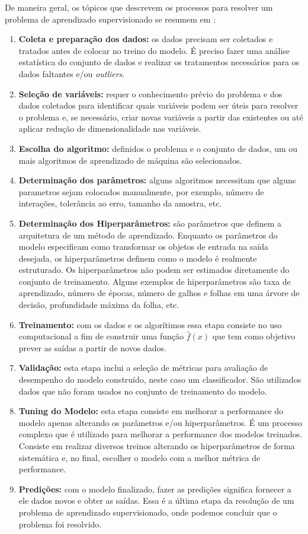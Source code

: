 De maneira geral, os tópicos que descrevem os processos para resolver um problema de aprendizado supervisionado se resumem em \cite{hastie} \cite{marsland}:

\begin{enumerate}
\item \textbf{Coleta e preparação dos dados:} os dados precisam ser coletados e tratados antes de colocar no treino do modelo. É preciso fazer uma análise estatística do conjunto de dados e realizar os tratamentos necessários para os dados faltantes e/ou \textit{outliers}.
\item \textbf{Seleção de variáveis:} requer o conhecimento prévio do problema e dos dados coletados para identificar quais variáveis podem ser úteis para resolver o problema e, se necessário, criar novas variáveis a partir das existentes ou até aplicar redução de dimensionalidade nas variáveis.
\item \textbf{Escolha do algoritmo:} definidos o problema e o conjunto de dados, um ou mais algoritmos de aprendizado de máquina são selecionados.
\item \textbf{Determinação dos parâmetros:} alguns algoritmos necessitam que alguns parametros sejam colocados manualmente, por exemplo, número de interações, tolerância ao erro, tamanho da amostra, etc.
\item \textbf{Determinação dos Hiperparâmetros:} são parâmetros que definem a arquitetura de um método de aprendizado. Enquanto os parâmetros do modelo especificam como transformar os objetos de entrada na saída desejada, os hiperparâmetros definem como o modelo é realmente estruturado. Os hiperparâmetros não podem ser estimados diretamente do conjunto de treinamento. Alguns exemplos de hiperparâmetros são taxa de aprendizado, número de épocas, número de galhos e folhas em uma árvore de decisão, profundidade máxima da folha, etc.
\item \textbf{Treinamento:} com os dados e os algorítimos essa etapa consiste no uso computacional a fim de construir uma função $\hat{f}(x)$ que tem como objetivo prever as saídas a partir de novos dados.
\item \textbf{Validação:} esta etapa inclui a seleção de métricas para avaliação de desempenho do modelo construído, neste caso um classificador. São utilizados dados que não foram usados no conjunto de treinamento do modelo.
\item \textbf{Tuning do Modelo:} esta etapa consiste em melhorar a performance do modelo apenas alterando os parâmetros e/ou hiperparâmetros. É um processo complexo que é utilizado para melhorar a performance dos modelos treinados. Consiste em realizar diversos treinos alterando os hiperparâmetros de forma sistemática e, no final, escolher o modelo com a melhor métrica de performance.
\item \textbf{Predições:} com o modelo finalizado, fazer as predições significa fornecer a ele dados novos e obter as saídas. Essa é a última etapa da resolução de um problema de aprendizado supervisionado, onde podemos concluir que o problema foi resolvido. 
\end{enumerate}
